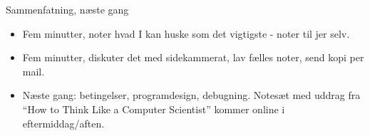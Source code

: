 \documentclass[a4paper,landscape]{slides}
\begin{document}
\begin{slide}
	\begin{center} {\large 
            Sammenfatning, næste gang
	} \end{center}
	\begin{itemize} \addtolength{\itemsep}{-\baselineskip}
		\item Fem minutter, noter hvad I kan huske som det vigtigste - noter til jer selv.
		\item Fem minutter, diskuter det med sidekammerat, lav fælles noter, send kopi per mail.
		\item Næste gang: betingelser, programdesign, debugning. Notesæt med uddrag fra ``How to Think Like a Computer Scientist'' kommer online i eftermiddag/aften.
	\end{itemize}
\end{slide}
\end{document}
